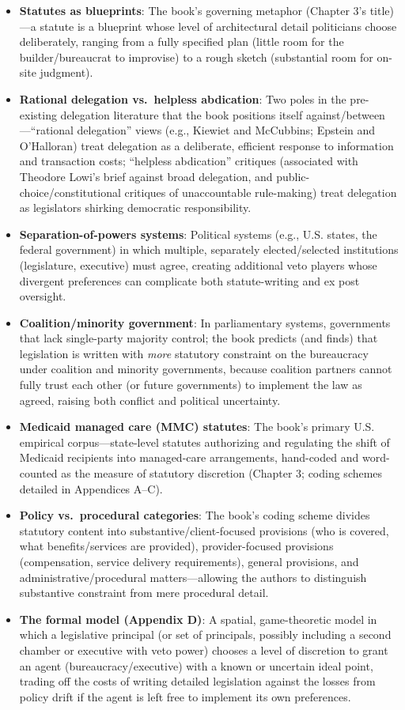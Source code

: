 \documentclass[12pt]{article}
\begin{document}
\begin{itemize}[leftmargin=*, itemsep=4pt]
    \item \textbf{Statutes as blueprints}: The book's governing metaphor (Chapter 3's title)---a statute is a blueprint whose level of architectural detail politicians choose deliberately, ranging from a fully specified plan (little room for the builder/bureaucrat to improvise) to a rough sketch (substantial room for on-site judgment).
    \item \textbf{Rational delegation vs.\ helpless abdication}: Two poles in the pre-existing delegation literature that the book positions itself against/between---``rational delegation'' views (e.g., Kiewiet and McCubbins; Epstein and O'Halloran) treat delegation as a deliberate, efficient response to information and transaction costs; ``helpless abdication'' critiques (associated with Theodore Lowi's brief against broad delegation, and public-choice/constitutional critiques of unaccountable rule-making) treat delegation as legislators shirking democratic responsibility.
    \item \textbf{Separation-of-powers systems}: Political systems (e.g., U.S. states, the federal government) in which multiple, separately elected/selected institutions (legislature, executive) must agree, creating additional veto players whose divergent preferences can complicate both statute-writing and ex post oversight.
    \item \textbf{Coalition/minority government}: In parliamentary systems, governments that lack single-party majority control; the book predicts (and finds) that legislation is written with \emph{more} statutory constraint on the bureaucracy under coalition and minority governments, because coalition partners cannot fully trust each other (or future governments) to implement the law as agreed, raising both conflict and political uncertainty.
    \item \textbf{Medicaid managed care (MMC) statutes}: The book's primary U.S. empirical corpus---state-level statutes authorizing and regulating the shift of Medicaid recipients into managed-care arrangements, hand-coded and word-counted as the measure of statutory discretion (Chapter 3; coding schemes detailed in Appendices A--C).
    \item \textbf{Policy vs.\ procedural categories}: The book's coding scheme divides statutory content into substantive/client-focused provisions (who is covered, what benefits/services are provided), provider-focused provisions (compensation, service delivery requirements), general provisions, and administrative/procedural matters---allowing the authors to distinguish substantive constraint from mere procedural detail.
    \item \textbf{The formal model (Appendix D)}: A spatial, game-theoretic model in which a legislative principal (or set of principals, possibly including a second chamber or executive with veto power) chooses a level of discretion to grant an agent (bureaucracy/executive) with a known or uncertain ideal point, trading off the costs of writing detailed legislation against the losses from policy drift if the agent is left free to implement its own preferences.
\end{itemize}
\end{document}
